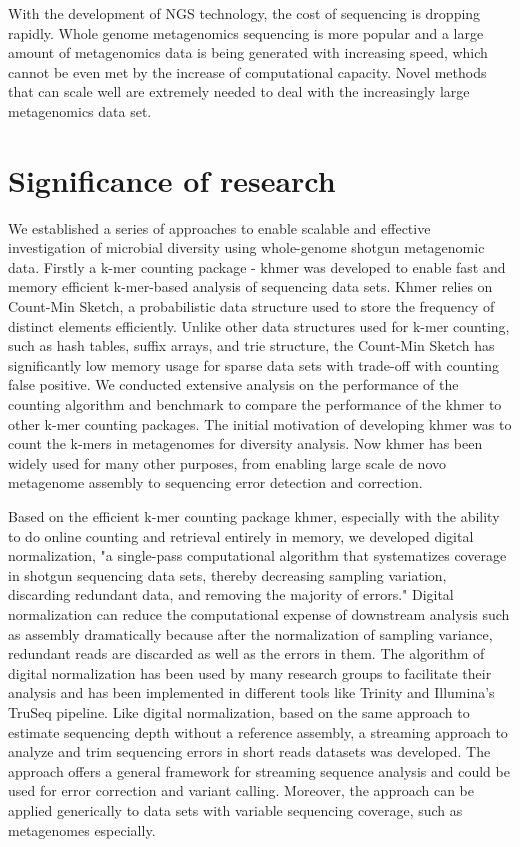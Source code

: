 With the development of NGS technology, the cost of sequencing is dropping
rapidly. Whole genome metagenomics sequencing is more popular and a large amount
of metagenomics data is being generated with increasing speed, which cannot be
even met by the increase of computational capacity. Novel methods that can
scale well are extremely needed to deal with the increasingly large
metagenomics data set.


\section{Significance of research}


We established a series of approaches to enable scalable and effective
investigation of microbial diversity using whole-genome shotgun metagenomic
data. Firstly a k-mer counting package - khmer was developed to enable fast and
memory efficient k-mer-based analysis of sequencing data sets\cite{Zhang2014,khmer}. Khmer relies on 
Count-Min Sketch, a probabilistic data structure used to store the frequency of 
distinct elements efficiently. Unlike other data structures used for k-mer 
counting, such as hash tables, suffix arrays, and trie structure, the Count-Min
Sketch has significantly low memory usage for sparse data sets with trade-off 
with counting false positive. We conducted extensive analysis on the
performance of the counting algorithm and benchmark to compare the performance
of the khmer to other k-mer counting packages. The initial motivation of
developing khmer was to count the  k-mers in metagenomes for diversity
analysis. Now khmer has been widely used for many other purposes, from enabling
large scale de novo metagenome assembly  to sequencing error detection and
correction.

Based on the efficient k-mer counting package khmer, especially with the ability
to do online counting and retrieval entirely in memory, we developed digital
normalization\cite{Brown2012}, "a single-pass computational algorithm that systematizes
coverage in shotgun sequencing data sets, thereby decreasing sampling 
variation, discarding redundant data, and removing the majority of errors." 
Digital normalization can reduce the computational expense of downstream analysis
such as assembly dramatically because after the normalization of sampling variance,
redundant reads are discarded as well as the errors in 
them. The algorithm of digital
normalization has been used by many research groups to facilitate their
analysis and has been implemented in different tools like Trinity and 
Illumina's TruSeq pipeline. Like digital normalization, based on the same
approach to estimate sequencing depth without a reference assembly, a streaming
approach to analyze and trim sequencing errors in short reads datasets was
developed\cite{zhang2015crossing}. The approach offers a general framework for streaming sequence
analysis and could be used for error correction and variant calling. Moreover,
the approach can be applied generically to data sets with variable sequencing
coverage, such as metagenomes especially.

